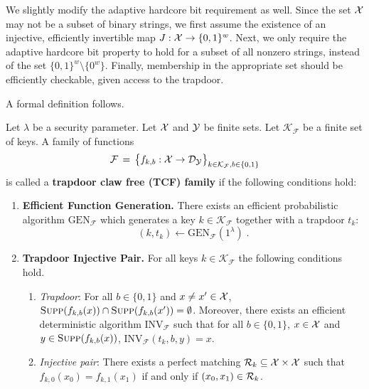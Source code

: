 We slightly modify the adaptive hardcore bit requirement as well. Since the set $\mathcal{X}$ may not be a subset of binary strings, we first assume the existence of an injective, efficiently invertible map $J:\mathcal{X}\to\{0,1\}^w$. Next, we only require the adaptive hardcore bit property to hold for a subset of all nonzero strings, instead of the  set $\{0,1\}^w\setminus \{0^w\}$. Finally, membership in the appropriate set should be efficiently checkable, given access to the trapdoor. 

A formal definition follows. 

\begin{definition}\label{def:trapdoorclawfree}
Let $\lambda$ be a security parameter. Let $\mathcal{X}$ and $\mathcal{Y}$ be finite sets.
 Let $\mathcal{K}_{\mathcal{F}}$ be a finite set of keys. A family of functions 
$$\mathcal{F} \,=\, \big\{f_{k,b} : \mathcal{X}\rightarrow \mathcal{D}_{\mathcal{Y}} \big\}_{k\in \mathcal{K}_{\mathcal{F}},b\in\{0,1\}}$$
is called a \textbf{trapdoor claw free (TCF) family} if the following conditions hold:

\begin{enumerate}
\item{\textbf{Efficient Function Generation.}} There exists an efficient probabilistic algorithm $\textrm{GEN}_{\mathcal{F}}$ which generates a key $k\in \mathcal{K}_{\mathcal{F}}$ together with a trapdoor $t_k$: 
$$(k,t_k) \leftarrow \textrm{GEN}_{\mathcal{F}}(1^\lambda)\;.$$
\item{\textbf{Trapdoor Injective Pair.}} For all keys $k\in \mathcal{K}_{\mathcal{F}}$ the following conditions hold. 
\begin{enumerate}
\item \textit{Trapdoor}: For all $b\in\{0,1\}$ and $x\neq x' \in \mathcal{X}$, $\textsc{Supp}(f_{k,b}(x))\cap \textsc{Supp}(f_{k,b}(x')) = \emptyset$. Moreover, there exists an efficient deterministic algorithm $\textrm{INV}_{\mathcal{F}}$ such that for all $b\in \{0,1\}$,  $x\in \mathcal{X}$ and $y\in \textsc{Supp}(f_{k,b}(x))$, $\textrm{INV}_{\mathcal{F}}(t_k,b,y) = x$. 
\item \textit{Injective pair}: There exists a perfect matching $\mathcal{R}_k \subseteq \mathcal{X} \times \mathcal{X}$ such that $f_{k,0}(x_0) = f_{k,1}(x_1)$ if and only if $(x_0,x_1)\in \mathcal{R}_k$. \end{enumerate}


\end{enumerate}
\end{definition}

